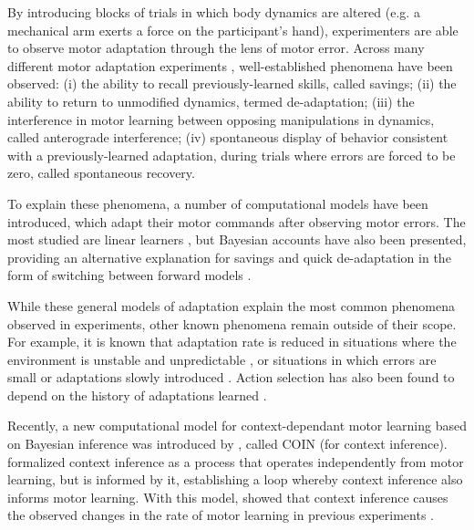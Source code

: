 \documentclass[a4paper,doc,floatsintext,natbib]{apa6}
\begin{document}
By introducing blocks of trials in which body dynamics are altered (e.g. a mechanical arm exerts a force on the participant's hand), experimenters are able to observe motor adaptation through the lens of motor error. Across many different motor adaptation experiments \citep[e.g.][]{Gandolfo_Motor_1996,Shadmehr_Adaptive_1994,Davidson_Scaling_2004}, well-established phenomena have been observed: (i) the ability to recall previously-learned skills, called savings; (ii) the ability to return to unmodified dynamics, termed de-adaptation; (iii) the interference in motor learning between opposing manipulations in dynamics, called anterograde interference; (iv) spontaneous display of behavior consistent with a previously-learned adaptation, during trials where errors are forced to be zero, called spontaneous recovery.

To explain these phenomena, a number of computational models have been introduced, which adapt their motor commands after observing motor errors. The most studied are linear learners \citep{Smith_Interacting_2006,Forano_Timescales_2020,Scheidt_Learning_2001}, but Bayesian accounts have also been presented, providing an alternative explanation for savings and quick de-adaptation in the form of switching between forward models \citep{Kording_Bayesian_2004,Oh_Minimizing_2019}.

While these general models of adaptation explain the most common phenomena observed in experiments, other known phenomena remain outside of their scope. For example, it is known that adaptation rate is reduced in situations where the environment is unstable and unpredictable \citep{Herzfeld_memory_2014}, or situations in which errors are small \citep{Marko_Sensitivity_2012} or adaptations slowly introduced \citep{Huang_Persistence_2009}. Action selection has also been found to depend on the history of adaptations learned \citep{Vaswani_Decay_2013,Davidson_Scaling_2004}.

Recently, a new computational model for context-dependant motor learning based on Bayesian inference was introduced by \cite{Heald_Contextual_2021}, called COIN (for context inference). \cite{Heald_Contextual_2021} formalized context inference as a process that operates independently from motor learning, but is informed by it, establishing a loop whereby context inference also informs motor learning. With this model, \cite{Heald_Contextual_2021} showed that context inference causes the observed changes in the rate of motor learning in previous experiments \cite[e.g.][]{Herzfeld_Encoding_2018}.
\end{document}
